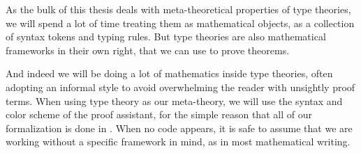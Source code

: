 As the bulk of this thesis deals with meta-theoretical properties of
type theories, we will spend a lot of time treating them as mathematical 
objects, \ie as a collection of syntax tokens and typing rules.
% 
But type theories are also mathematical frameworks in their own right, that
we can use to prove theorems. 

And indeed we will be doing a lot of mathematics inside type theories, often
adopting an informal style to avoid overwhelming the reader with unsightly
proof terms.
% 
When using type theory as our meta-theory, we will use the syntax and color 
scheme of the \Agda proof assistant, for the simple reason that all of our
formalization is done in \Agda.
% 
When no \Agda code appears, it is safe to assume that we are working without
a specific framework in mind, as in most mathematical writing.







